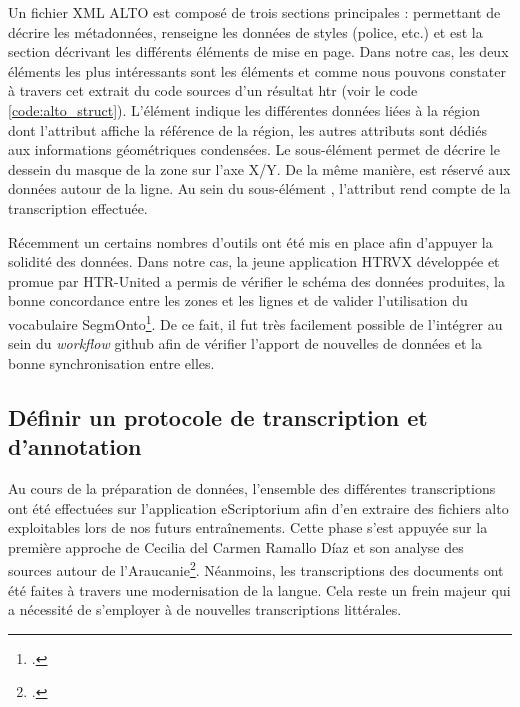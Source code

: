     Un fichier XML ALTO est composé de trois sections principales :  permettant de décrire les métadonnées,  renseigne les données de styles (police, etc.) et  est la section décrivant les différents éléments de mise en page. Dans notre cas, les deux éléments les plus intéressants sont les éléments  et  comme nous pouvons constater à travers cet extrait du code sources d'un résultat \gls{htr} (voir le code \ref{code:alto_struct}). L'élément  indique les différentes données liées à la région dont l'attribut  affiche la référence de la région, les autres attributs sont dédiés aux informations géométriques condensées. Le sous-élément  permet de décrire le dessein du masque de la zone sur l'axe X/Y. De la même manière,  est réservé aux données autour de la ligne. Au sein du sous-élément , l'attribut  rend compte de la transcription effectuée. \newpar
    
    Récemment un certains nombres d'outils ont été mis en place afin d'appuyer la solidité des données. Dans notre cas, la jeune application HTRVX développée et promue par HTR-United a permis de vérifier le schéma des données produites, la bonne concordance entre les zones et les lignes et de valider l'utilisation du vocabulaire SegmOnto\footcite{clericeHTRUnitedHTRVXHTRVX2022}. De ce fait, il fut très facilement possible de l'intégrer au sein du \textit{workflow} \gls{github} afin de vérifier l'apport de nouvelles de données et la bonne synchronisation entre elles.
	
	\subsection{Définir un protocole de transcription et d'annotation}
	
	Au cours de la préparation de données, l'ensemble des différentes transcriptions ont été effectuées sur l'application \gls{eScriptorium} afin d'en extraire des fichiers \gls{alto} exploitables lors de nos futurs entraînements. Cette phase s'est appuyée sur la première approche de Cecilia del Carmen Ramallo Díaz et son analyse des sources autour de l'Araucanie\footcite{carmenramallodiazdelTranscripcionDocumentosSerie2014}. Néanmoins, les transcriptions des documents ont été faites à travers une modernisation de la langue. Cela reste un frein majeur qui a nécessité de s'employer à de nouvelles transcriptions littérales.
	
